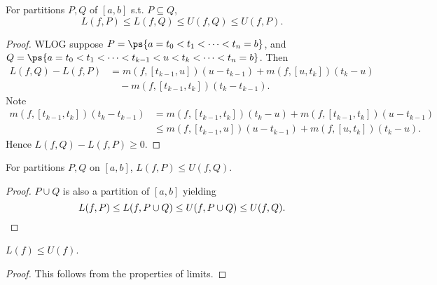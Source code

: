\documentclass[11pt]{scrartcl}
\numberwithin{equation}{section}
\begin{document}
\begin{lemma}
    For partitions $P,Q$ of $[a,b]$ s.t. $P \subseteq Q$,
    \[
        L(f,P) \leq L(f,Q) \leq U(f,Q) \leq U(f,P).
    \]
\end{lemma}

\begin{proof}
    WLOG suppose $P = \ps{a=t_0<t_1<\cdots<t_n = b}$, and \\
    $Q = \ps{a=t_0<t_1<\cdots<t_{k-1}<u<t_k<\cdots<t_n = b}$.
    Then 
    \begin{align*}
        L(f,Q) - L(f,P) &= m(f, [t_{k-1},u])(u-t_{k-1}) + m(f, [u,t_{k}])(t_{k}-u)\\ &\quad- m(f,[t_{k-1},t_k])(t_k-t_{k-1}).
    \end{align*}
    Note 
    \begin{align*}
        m(f,[t_{k-1},t_k])(t_k-t_{k-1}) &= m(f,[t_{k-1},t_k])(t_k-u) + m(f,[t_{k-1},t_k])(u-t_{k-1}) \\
        &\leq m(f, [t_{k-1},u])(u-t_{k-1}) + m(f, [u,t_{k}])(t_{k}-u).
    \end{align*}
    Hence $L(f,Q)-L(f,P)\geq 0$.
\end{proof}

\begin{lemma}
    For partitions $P,Q$ on $[a,b]$, $L(f,P)\leq U(f,Q)$.
\end{lemma}
\begin{proof}
    $P\cup Q$ is also a partition of $[a,b]$ yielding 
    \[
        L(f,P) \leq L(f,P\cup Q) \leq  U(f,P\cup Q) \leq U(f,Q).\qedhere
    \]
\end{proof}
\begin{proposition}
    $L(f)\leq U(f)$.
\end{proposition}

\begin{proof}
    This follows from the properties of limits.
\end{proof}
\end{document}
